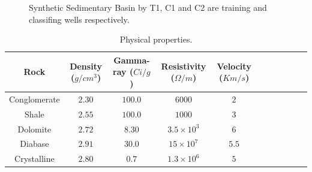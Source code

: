 \documentclass{cph18}
\begin{document}
\begin{figure}[ht]
	\centering
	\setlength{\fboxsep}{8pt}
	\setlength{\fboxrule}{0.1pt}
	\caption{Synthetic Sedimentary Basin by \cite{Sal2008}  T1, C1 and C2 are training and classifing wells respectively.}
	\label{Model}
\end{figure}




\begin{table}[H]
\centering
\begin{tabular}{@{}ccccccccccc@{}}
\toprule
Rock & Density ($g/cm^{3}$) & Gamma-ray ($Ci/g$) & Resistivity ($\Omega/m$)& Velocity ($Km/s$) &\\ \midrule
Conglomerate &     $2.30$ 		  &       $100.0$       &           $6000$           &			$2$   		   	&\\
Shale	 &       $2.55$           &       $100.0$       &           $1000$           &     		$3$		 &\\
Dolomite     &       $2.72$           &       $8.30$        &           $3.5 \times 10^{3}$           &  	$6$    			 &\\
Diabase    &       $2.91$           &       $30.0$        &           $15 \times 10^{7}$           &      $5.5$				 &\\
Crystalline  &       $2.80$           &       $0.7$         &           $1.3 \times 10^{6}$           & 		$5$		     &\\ \bottomrule
\end{tabular}
\caption{Physical properties.}
\label{Tab1}
\end{table}

\end{document}
